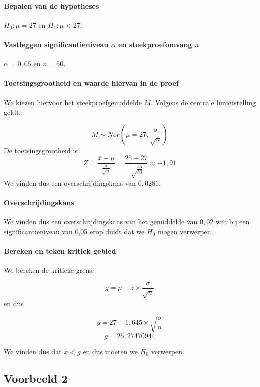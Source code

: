 \paragraph{Bepalen van de hypotheses}

$H_{0} : \mu = 27$ en $H_{1}: \mu < 27$.

\paragraph{Vastleggen significantieniveau $\alpha$ en steekproefomvang $n$}

$\alpha = 0,05$ en $n=50$.

\paragraph{Toetsingsgrootheid en waarde hiervan in de proef}

We kiezen hiervoor het steekproefgemiddelde $M$. Volgens de centrale limietstelling geldt:

\[ M \sim Nor(\mu = 27, \frac{\sigma}{\sqrt{n}}) \]
De toetsingsgrootheid is
\[ Z = \frac{\overline{x} - \mu}{\frac{\sigma}{\sqrt{n}}} = \frac{25-27}{\sqrt\frac{55}{50}} \approx -1,91\]
We vinden dus een overschrijdingskans van $0,0281$.

\paragraph{Overschrijdingskans}

We vinden dus een overschrijdingskans van het gemiddelde van $0,02$ wat bij een significantieniveau van 0,05 erop duidt dat we $H_{0}$ mogen verwerpen.

\paragraph{Bereken en teken kritiek gebied}

We bereken de kritieke grens:

\[ g = \mu - z \times \frac{\sigma}{\sqrt{n}} \]
en dus

\[ g = 27 - 1,645 \times \sqrt{\frac{\sigma}{n}} \]
\[ g =  25,27470944 \]

We vinden dus dat $\overline{x} < g$ en dus moeten we $H_{0}$ verwerpen.

\subsection{Voorbeeld 2}

